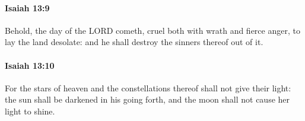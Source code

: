 		\paragraph{Isaiah 13:9} %
			\label{ISAIAH-13-9}

			Behold, the day of the LORD cometh, cruel both with wrath and fierce anger, to lay the land desolate: and he shall destroy the sinners thereof out of it.


		\paragraph{Isaiah 13:10} %
			\label{ISAIAH-13-10}

			For the stars of heaven and the constellations thereof shall not give their light: the sun shall be darkened in his going forth, and the moon shall not cause her light to shine.


